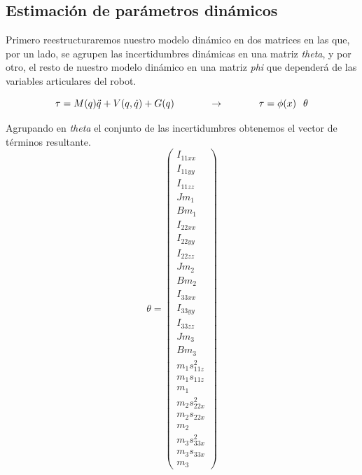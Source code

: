 	\subsection{Estimación de parámetros dinámicos}
		Primero reestructuraremos nuestro modelo dinámico en dos matrices en las que, por un lado,
		se agrupen las incertidumbres dinámicas en una matriz \textit{theta}, y por otro, el resto de nuestro modelo
		dinámico en una matriz \textit{phi} que dependerá de las variables articulares del robot.

		\begin{equation}
			\tau=M(q)\ddot{q}+V(q,\dot{q})+G(q) \hspace{1.25cm}  \rightarrow \hspace{1.25cm} \tau=\phi(x) \hspace{0.25cm} \theta
			\end{equation}


	Agrupando en \textit{theta} el conjunto de las incertidumbres obtenemos el vector de términos resultante.
	\begin{equation}
		\theta=
			\begin{pmatrix}
				I_{11xx} \\
				I_{11yy}\\
				I_{11zz}\\
				Jm_{1} \\
				Bm_{1} \\
				I_{22xx} \\
				I_{22yy}\\
				I_{22zz}\\
				Jm_{2} \\
				Bm_{2} \\
				I_{33xx} \\
				I_{33yy}\\
				I_{33zz}\\
				Jm_{3} \\
				Bm_{3} \\
				m_{1}s_{11z}^{2} \\
				m_{1}s_{11z} \\
				m_{1}\\
				m_{2}s_{22x}^{2} \\
				m_{2}s_{22x} \\
				m_{2}\\
				m_{3}s_{33x}^{2} \\
				m_{3}s_{33x} \\
				m_{3}
				\end{pmatrix}
		\end{equation}

